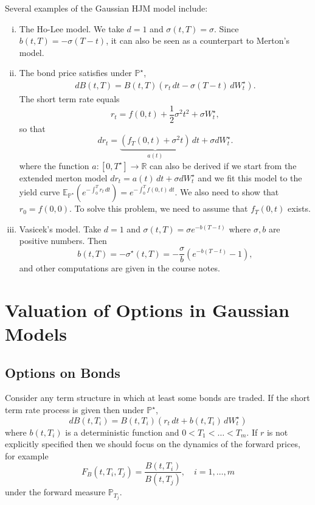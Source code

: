 \documentclass[10pt, oneside, reqno]{amsbook}
\theoremstyle{plain}%
\theoremstyle{definition}
\theoremstyle{remark}
\newcommand{\R}{\mathbb{R}}
\newcommand{\E}{\mathbb{E}}
\renewcommand{\P}{\mathbb{P}}
\numberwithin{equation}{chapter}
\begin{document}
Several examples of the Gaussian HJM model include: 
\begin{enumerate}[(i)]
	\item The Ho-Lee model.  We take $d = 1$ and $\sigma(t, T) = \sigma$.  Since $b(t, T) = - \sigma(T-t)$, it can also be seen as a counterpart to Merton's model.
	\item The bond price satisfies under $\P^\star$, \begin{align*}
		dB(t, T) = B(t, T) \left( r_t \, dt - \sigma(T- t) \, dW^\star_t \right).
	\end{align*}  The short term rate equals\[
		r_t = f(0, t) + \frac{1}{2} \sigma^2 t^2 + \sigma W^\star_t,
	\] so that \[
		dr_t = \underbrace{\left( f_T(0, t) + \sigma^2 t \right)}_{a(t)} \, dt + \sigma dW^\star_t .
	\] where the function $a : [0, T^\star] \rightarrow \R$ can also be derived if we start from the extended merton model $dr_t = a(t) \, dt + \sigma dW^\star_t$ and we fit this model to the yield curve $\E_{\P^\star} \left( e^{-\int_0^T r_t \, dt} \right) = e^{-\int_0^T f(0, t) \, dt}$.  We also need to show that $r_0 = f(0, 0)$.  To solve this problem, we need to assume that $f_T(0, t)$ exists.
	\item Vasicek's model.  Take $d = 1$ and $\sigma(t, T) = \sigma e^{-b(T-t)}$ where $\sigma, b$ are positive numbers.  Then \[
		b(t, T) = -\sigma^\star(t, T) = - \frac{\sigma}{b} \left(e^{-b(T- t)} - 1\right),
	\]  and other computations are given in the course notes.
\end{enumerate}




\chapter{Valuation of Options in Gaussian Models} %
\label{sec:valuation_of_options_in_gaussian_models}
\section{Options on Bonds} %
\label{sec:options_on_bonds}

Consider any term structure in which at least some bonds are traded.  If the short term rate process is given then under $\P^\star$, \[
	dB(t, T_i) = B(t, T_i) \left( r_t \, dt + b(t, T_i) \, dW^\star_t \right)
\] where $b(t, T_i)$ is a deterministic function and $0 < T_1 < \dots < T_m$.  If $r$ is not explicitly specified then we should focus on the dynamics of the forward prices, for example \[
	F_B(t, T_i, T_j) = \frac{B(t, T_i)}{B(t, T_j)}, \quad i = 1, \dots, m
\] under the forward measure $\P_{T_j}$.
\end{document}
